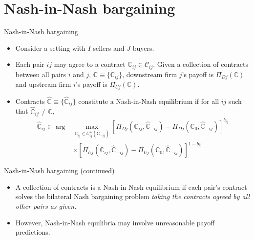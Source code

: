 \documentclass[aspectratio=169]{beamer}  %
\begin{document}
\section{Nash-in-Nash bargaining}
\begin{frame}{Nash-in-Nash bargaining}
    \begin{itemize}
        \item Consider a setting with $I$ sellers and $J$ buyers. \vspace{.2cm}
        \item Each pair $ij$ may agree to a contract $\mathbb{C}_{ij}\in\mathcal{C}_{ij}$. Given a collection of contracts between all pairs $i$ and $j$, $\mathbb{C}\equiv\{\mathbb{C}_{ij}\}$, downstream firm $j$'s payoff is $\Pi_{Dj}(\mathbb{C})$ and upstream firm $i$'s payoff is $\Pi_{Uj}(\mathbb{C})$. \vspace{.2cm}
        \item Contracts $\hat{\mathbb{C}}\equiv \{\hat{\mathbb{C}}_{ij}\}$ constitute a Nash-in-Nash equilibrium if for all $ij$ such that $\hat{\mathbb{C}}_{ij}\neq \mathbb{C}$,  \vspace{.2cm}
        \begin{equation}
        \begin{aligned}
            \hat{\mathbb{C}}_{ij} \in \arg &\max_{\mathbb{C}_{ij} \in \mathcal{C}_{ij}^+ (\hat{\mathbb{C}}_{-ij})} [ \Pi_{Dj}(\mathbb{C}_{ij},\hat{\mathbb{C}}_{-ij}) - \Pi_{Dj}(\mathbb{C}_{0},\hat{\mathbb{C}}_{-ij})]^{b_{ij}}\\
            & \times [ \Pi_{Uj}(\mathbb{C}_{ij},\hat{\mathbb{C}}_{-ij}) - \Pi_{Uj}(\mathbb{C}_{0},\hat{\mathbb{C}}_{-ij})]^{1-b_{ij}}
        \end{aligned}
        \end{equation}
    \end{itemize}
\end{frame}



\begin{frame}{Nash-in-Nash bargaining (continued)}
    \begin{itemize}
        \item A collection of contracts is a Nash-in-Nash equilibrium if each pair's contract solves the bilateral Nash bargaining problem \textit{taking the contracts agreed by all other pairs as given.} \vspace{.2cm}
        \item However, Nash-in-Nash equilibria may involve unreasonable payoff predictions. \vspace{.2cm}
    \end{itemize}
\end{frame}
\end{document}
